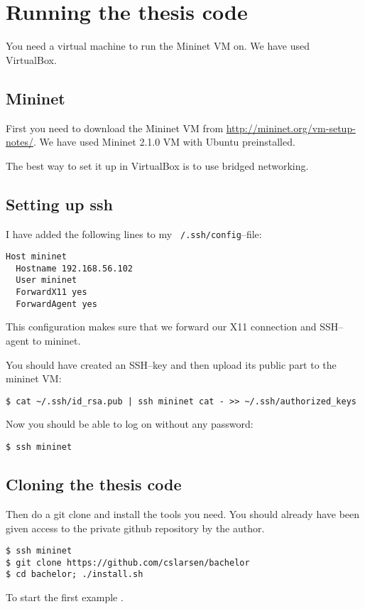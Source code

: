 \chapter{Running the thesis code}

You need a virtual machine to run the Mininet VM on.  We have used
VirtualBox.

\section{Mininet}

First you need to download the Mininet VM from
\url{http://mininet.org/vm-setup-notes/}.  We have used Mininet 2.1.0 VM
with Ubuntu preinstalled.

The best way to set it up in VirtualBox is to use bridged
networking.

\section{Setting up ssh}

I have added the following lines to my \texttt{~/.ssh/config}--file:

\begin{verbatim}
Host mininet
  Hostname 192.168.56.102
  User mininet
  ForwardX11 yes
  ForwardAgent yes
\end{verbatim}

This configuration makes sure that we forward our X11 connection and
SSH--agent to mininet.

You should have created an SSH--key and then upload its public part to the
mininet VM:

\begin{verbatim}
$ cat ~/.ssh/id_rsa.pub | ssh mininet cat - >> ~/.ssh/authorized_keys
\end{verbatim}

Now you should be able to log on without any password:

\begin{verbatim}
$ ssh mininet
\end{verbatim}

\section{Cloning the thesis code}

Then do a git clone and install the tools you need. You should already have
been given access to the private github repository by the author.

\begin{Verbatim}
$ ssh mininet
$ git clone https://github.com/cslarsen/bachelor
$ cd bachelor; ./install.sh
\end{Verbatim}

To start the first example .
